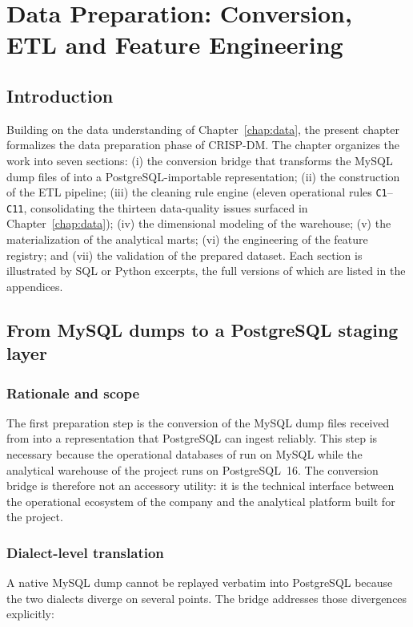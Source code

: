 \chapter{Data Preparation: Conversion, ETL and Feature Engineering}
\label{chap:prep}

\section{Introduction}
Building on the data understanding of Chapter~\ref{chap:data}, the present chapter formalizes the data preparation phase of CRISP-DM. The chapter organizes the work into seven sections: (i) the conversion bridge that transforms the MySQL dump files of \hostorg{} into a PostgreSQL-importable representation; (ii) the construction of the ETL pipeline; (iii) the cleaning rule engine (eleven operational rules \texttt{C1}--\texttt{C11}, consolidating the thirteen data-quality issues surfaced in Chapter~\ref{chap:data}); (iv) the dimensional modeling of the warehouse; (v) the materialization of the analytical marts; (vi) the engineering of the feature registry; and (vii) the validation of the prepared dataset. Each section is illustrated by SQL or Python excerpts, the full versions of which are listed in the appendices.

\section{From MySQL dumps to a PostgreSQL staging layer}

\subsection{Rationale and scope}
The first preparation step is the conversion of the MySQL dump files received from \hostorg{} into a representation that PostgreSQL can ingest reliably. This step is necessary because the operational databases of \hostorg{} run on MySQL while the analytical warehouse of the project runs on PostgreSQL~16. The conversion bridge is therefore not an accessory utility: it is the technical interface between the operational ecosystem of the company and the analytical platform built for the project.

\subsection{Dialect-level translation}
A native MySQL dump cannot be replayed verbatim into PostgreSQL because the two dialects diverge on several points. The bridge addresses those divergences explicitly:

